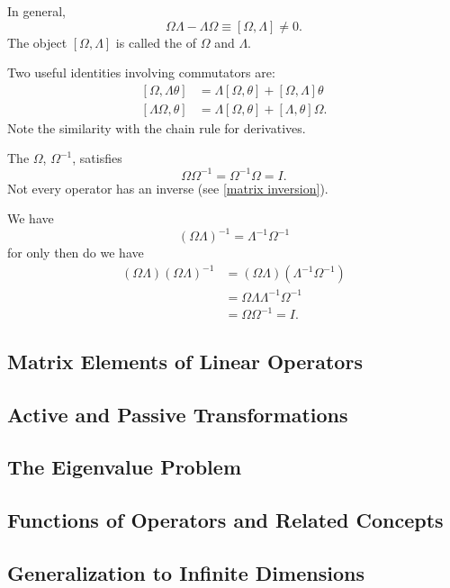In general,
\begin{equation}\label{commutator}
    \boxed{\Omega\Lambda - \Lambda\Omega \equiv [\Omega, \Lambda] \neq 0.}
\end{equation}
The object $[\Omega, \Lambda]$ is called the  of $\Omega$ and $\Lambda$.

Two useful identities involving commutators are:
\begin{align}\label{commutator identities}
    [\Omega, \Lambda \theta] &= \Lambda[\Omega, \theta] + [\Omega, \Lambda]\theta \\
    [\Lambda \Omega, \theta] &= \Lambda[\Omega, \theta] + [\Lambda, \theta]\Omega. \nonumber
\end{align}
Note the similarity with the chain rule for derivatives.

The  $\Omega$, $\Omega^{-1}$, satisfies
\begin{equation}\label{operator inverse}
    \boxed{\Omega\Omega^{-1} = \Omega^{-1}\Omega = I.}
\end{equation}
Not every operator has an inverse (see \eqref{matrix inversion}).

We have
\begin{equation}\label{operator product inverse}
    \boxed{(\Omega\Lambda)^{-1} = \Lambda^{-1}\Omega^{-1}}
\end{equation}
for only then do we have
\begin{align*}
    (\Omega\Lambda)(\Omega\Lambda)^{-1} &= (\Omega\Lambda)(\Lambda^{-1}\Omega^{-1}) \\
    &= \Omega\Lambda\Lambda^{-1}\Omega^{-1} \\
    &= \Omega\Omega^{-1} = I.
\end{align*}

\subsection{Matrix Elements of Linear Operators}

\subsection{Active and Passive Transformations}

\subsection{The Eigenvalue Problem}

\subsection{Functions of Operators and Related Concepts}

\subsection{Generalization to Infinite Dimensions}

